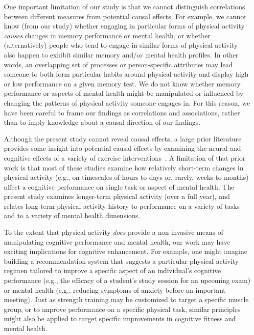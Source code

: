 \documentclass[10pt]{article}
\begin{document}
One important limitation of our study is that we cannot distinguish
correlations between different measures from potential causal
effects.  For example, we cannot know (from our study) whether
engaging in particular forms of physical activity \textit{causes} changes in
memory performance or mental health, or whether (alternatively) people
who tend to engage in similar forms of physical activity also happen to
exhibit similar memory and/or mental health profiles.  In other words,
an overlapping set of processes or person-specific attributes may lead
someone to both form particular habits around physical activity and display high or low performance on a
given memory test.  We do not know whether memory performance or
aspects of mental health might be manipulated or influenced by
changing the patterns of physical activity someone engages in.  For
this reason, we have been careful to frame our findings as
correlations and associations, rather than to imply knowledge about a causal direction
of our findings.

Although the present study cannot reveal causal effects, a large prior
literature provides some insight into potential causal effects by examining the neural and cognitive effects of a variety
of exercise interventions~\citep{ChanEtal15, VidoEtal15, KamiEtal07,
  ImboEtal19, SuwaEtal17, SinhEtal21, Tomp03}.  A limitation of that
prior work is that most of these studies examine how relatively
short-term changes in physical activity (e.g., on timescales of hours to days
or, rarely, weeks to months) affect a cognitive performance on single
task or aspect of mental health.  The present study examines
longer-term physical activity (over a full year), and relates long-term
physical activity history to performance on a variety of tasks and to a variety
of mental health dimensions.

To the extent that physical activity \textit{does} provide a non-invasive means
of manipulating cognitive performance and mental health, our work may
have exciting implications for cognitive enhancement.  For example,
one might imagine building a recommendation system that suggests a
particular physical activity regimen tailored to improve a specific aspect of
an individual's cognitive performance (e.g., the efficacy of a student's study session for an
upcoming exam) or mental health (e.g., reducing symptoms of anxiety
before an important meeting).  Just as strength training may be
customized to target a specific muscle group, or to improve
performance on a specific physical task, similar principles might also
be applied to target specific improvements in cognitive fitness
and mental health.
\end{document}
